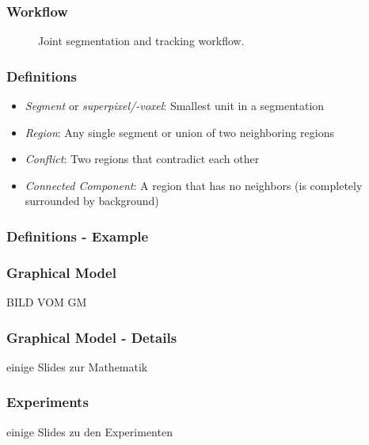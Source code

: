 \begin{frame}
    \frametitle{Workflow}
    \begin{figure}
        \centering
        \scalebox{0.65}{
            
        }
        \caption{Joint segmentation and tracking workflow.}
        \label{fig:joint-pipeline}
    \end{figure}
\end{frame}

\begin{frame}
    \frametitle{Definitions}
    \begin{itemize}
          \item \emph{Segment} or \emph{superpixel/-voxel}: Smallest unit in a segmentation
          \item \emph{Region}: Any single segment or union of two neighboring regions
          \item \emph{Conflict}: Two regions that contradict each other
          \item \emph{Connected Component}: A region that has no neighbors (is completely surrounded
        by background)
    \end{itemize}
\end{frame}

\begin{frame}
    \frametitle{Definitions - Example}

\end{frame}

\begin{frame}
    \frametitle{Graphical Model}
    BILD VOM GM
\end{frame}

\begin{frame}
    \frametitle{Graphical Model - Details}
    einige Slides zur Mathematik
\end{frame}

\begin{frame}
    \frametitle{Experiments}
    einige Slides zu den Experimenten
\end{frame}


